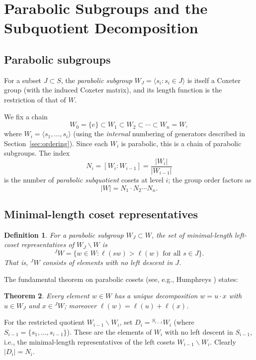 \documentclass[12pt]{amsart}
\newtheorem{theorem}{Theorem}[section]
\newtheorem{definition}[theorem]{Definition}
\begin{document}
\section{Parabolic Subgroups and the Subquotient Decomposition}

\subsection{Parabolic subgroups}

For a subset $J \subset S$, the \emph{parabolic subgroup} $W_J =
\langle s_i : s_i \in J \rangle$ is itself a Coxeter group (with the induced
Coxeter matrix), and its length function is the restriction of that of $W$.

We fix a chain
\[
  W_0 = \{e\} \subset W_1 \subset W_2 \subset \cdots \subset W_n = W,
\]
where $W_i = \langle s_1, \ldots, s_i \rangle$ (using the \emph{internal}
numbering of generators described in Section~\ref{sec:ordering}).  Since each
$W_i$ is parabolic, this is a chain of parabolic subgroups.  The index
\[
  N_i = [W_i : W_{i-1}] = \frac{|W_i|}{|W_{i-1}|}
\]
is the number of \emph{parabolic subquotient} cosets at level $i$; the group
order factors as
\[
  |W| = N_1 \cdot N_2 \cdots N_n.
\]

\subsection{Minimal-length coset representatives}

\begin{definition}
For a parabolic subgroup $W_J \subset W$, the set of
\emph{minimal-length left-coset representatives} of $W_J \backslash W$ is
\[
  {}^J W = \{w \in W : \ell(sw) > \ell(w) \text{ for all } s \in J\}.
\]
That is, ${}^J W$ consists of elements with no left descent in $J$.
\end{definition}

The fundamental theorem on parabolic cosets (see, e.g., Humphreys
\cite{Humphreys}) states:

\begin{theorem}\label{thm:coset-rep}
Every element $w \in W$ has a unique decomposition $w = u \cdot x$ with
$u \in W_J$ and $x \in {}^J W$; moreover $\ell(w) = \ell(u) + \ell(x)$.
\end{theorem}

For the restricted quotient $W_{i-1} \backslash W_i$, set $D_i = {}^{S_{i-1}}
W_i$ (where $S_{i-1} = \{s_1, \ldots, s_{i-1}\}$).  These are the elements of
$W_i$ with no left descent in $S_{i-1}$, i.e., the minimal-length
representatives of the left cosets $W_{i-1} \backslash W_i$.  Clearly
$|D_i| = N_i$.
\end{document}
